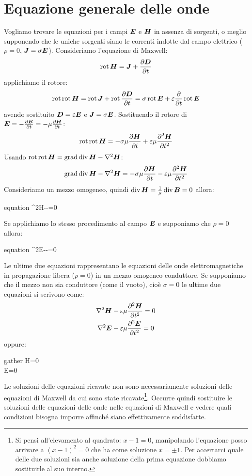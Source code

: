 \section{Equazione generale delle onde}
Vogliamo trovare le equazioni per i campi $\boldsymbol{E}$ e $\boldsymbol{H}$ in assenza di sorgenti, o meglio supponendo che le uniche sorgenti siano le correnti indotte dal campo elettrico ($\rho=0$, $\boldsymbol{J}=\sigma\boldsymbol{E}$).
Consideriamo l'equazione di Maxwell:
\[
  \operatorname{rot}\boldsymbol{H}=\boldsymbol{J}+\frac{\partial\boldsymbol{D}}{\partial t}
\]
applichiamo il rotore:
\[
  \operatorname{rot}\operatorname{rot} \boldsymbol{H}=\operatorname{rot} \boldsymbol{J}+\operatorname{rot}\frac{\partial\boldsymbol{D}}{\partial t}=\sigma\operatorname{rot}\boldsymbol{E}+\varepsilon\frac{\partial}{\partial t}\operatorname{rot}\boldsymbol{E}
\]
avendo sostituito $\boldsymbol{D}=\varepsilon\boldsymbol{E}$ e $\boldsymbol{J}=\sigma \boldsymbol{E}$. Sostituendo il rotore di $\boldsymbol{E}=-\frac{\partial\boldsymbol{B}}{\partial t}=-\mu\frac{\partial\boldsymbol{H}}{\partial t}$:
\[
  \operatorname{rot}\operatorname{rot} \boldsymbol{H}=-\sigma\mu\frac{\partial\boldsymbol{H}}{\partial t}+\varepsilon\mu\frac{\partial^2\boldsymbol{H}}{\partial t^2}
\]
Usando $\operatorname{rot}\operatorname{rot}\boldsymbol{H}=\operatorname{grad}\operatorname{div}\boldsymbol{H}-\nabla^2\boldsymbol{H}$:
\begin{equation}
  \operatorname{grad}\operatorname{div}\boldsymbol{H}-\nabla^2\boldsymbol{H}=-\sigma\mu\frac{\partial\boldsymbol{H}}{\partial t}-\varepsilon\mu\frac{\partial^2\boldsymbol{H}}{\partial t^2}
\end{equation}
Consideriamo un mezzo omogeneo, quindi $\operatorname{div}\boldsymbol{H}=\frac{1}{\mu}\operatorname{div}\boldsymbol{B}=0$ allora:
\begin{eqimp}{equation}
  \nabla^2\ve H-\varepsilon\mu{}-\sigma\mu{}=0
\end{eqimp}
Se applichiamo lo stesso procedimento al campo $\boldsymbol{E}$ e supponiamo che $\rho=0$ allora:
\begin{eqimp}{equation}
  \nabla^2\ve E-\varepsilon\mu{}-\sigma\mu{}=0
\end{eqimp}
Le ultime due equazioni rappresentano le equazioni delle onde elettromagnetiche in propagazione libera ($\rho=0$) in un mezzo omogeneo conduttore. Se supponiamo che il mezzo non sia conduttore (come il vuoto), cioè $\sigma=0$ le ultime due equazioni si scrivono come:
\begin{gather}
  \nabla^2\boldsymbol{H}-\varepsilon\mu\frac{\partial^2\boldsymbol{H}}{\partial t^2}=0\\
  \nabla^2\boldsymbol{E}-\varepsilon\mu\frac{\partial^2\boldsymbol{E}}{\partial t^2}=0
\end{gather}
oppure:
\begin{eqimp}{gather}
  \Box\ve H=0\\
  \Box\ve E=0
\end{eqimp}
Le soluzioni delle equazioni ricavate non sono necessariamente soluzioni delle equazioni di Maxwell da cui sono state ricavate\footnote{Si pensi all'elevamento al quadrato: $x-1=0$, manipolando l'equazione posso arrivare a $(x-1)^2=0$ che ha come soluzione $x=\pm 1$. Per accertarci quale delle due soluzioni sia anche soluzione della prima equazione dobbiamo sostituirle al suo interno.}. Occurre quindi sostituire le soluzioni delle equazioni delle onde nelle equazioni di Maxwell e vedere quali condizioni bisogna imporre affinché siano effettivamente soddisfatte.

